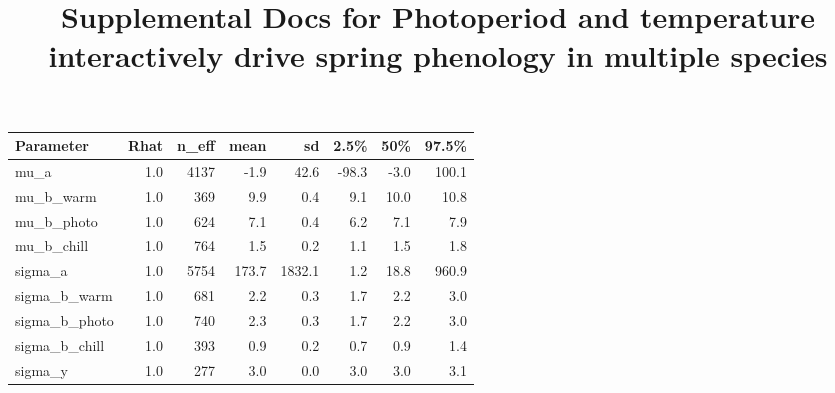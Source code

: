 \documentclass[11pt]{article}
\title{Supplemental Docs for Photoperiod and temperature interactively drive spring phenology in multiple species}
\begin{document}
\maketitle


%
\begin{table}[ht]
\centering
\begin{tabular}{lrrrrrrr}
  \toprule
Parameter & Rhat & n\_eff & mean & sd & 2.5\% & 50\% & 97.5\% \\ 
  \midrule
  mu\_a & 1.0 & 4137 & -1.9 & 42.6 & -98.3 & -3.0 & 100.1 \\ 
  mu\_b\_warm & 1.0 & 369 & 9.9 & 0.4 & 9.1 & 10.0 & 10.8 \\ 
  mu\_b\_photo & 1.0 & 624 & 7.1 & 0.4 & 6.2 & 7.1 & 7.9 \\ 
  mu\_b\_chill & 1.0 & 764 & 1.5 & 0.2 & 1.1 & 1.5 & 1.8 \\ 
  sigma\_a & 1.0 & 5754 & 173.7 & 1832.1 & 1.2 & 18.8 & 960.9 \\ 
  sigma\_b\_warm & 1.0 & 681 & 2.2 & 0.3 & 1.7 & 2.2 & 3.0 \\ 
  sigma\_b\_photo & 1.0 & 740 & 2.3 & 0.3 & 1.7 & 2.2 & 3.0 \\ 
  sigma\_b\_chill & 1.0 & 393 & 0.9 & 0.2 & 0.7 & 0.9 & 1.4 \\ 
  sigma\_y & 1.0 & 277 & 3.0 & 0.0 & 3.0 & 3.0 & 3.1 \\ 
   \bottomrule
\end{tabular}
\end{table}
\end{document}
